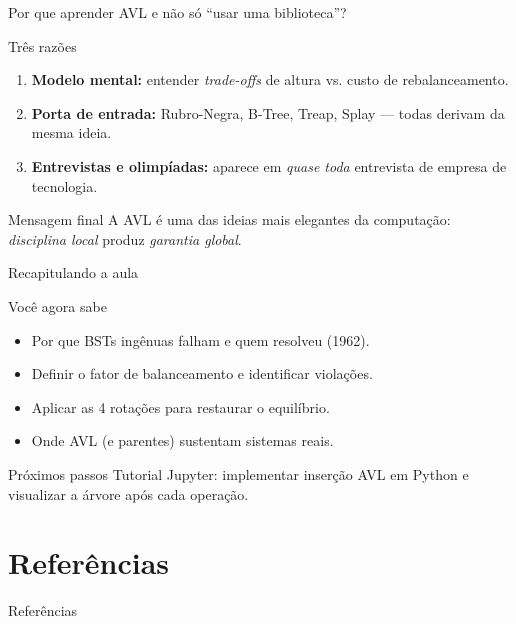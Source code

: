 \documentclass[aspectratio=169]{beamer}
\begin{document}
\begin{frame}{Por que aprender AVL e não só ``usar uma biblioteca''?}
  \begin{block}{Três razões}
    \begin{enumerate}
      \item \textbf{Modelo mental:} entender \emph{trade-offs} de altura
            vs. custo de rebalanceamento.
      \item \textbf{Porta de entrada:} Rubro-Negra, B-Tree, Treap,
            Splay — todas derivam da mesma ideia.
      \item \textbf{Entrevistas e olimpíadas:} aparece em
            \emph{quase toda} entrevista de empresa de tecnologia.
    \end{enumerate}
  \end{block}
  \begin{alertblock}{Mensagem final}
    A AVL é uma das ideias mais elegantes da computação:
    \emph{disciplina local} produz \emph{garantia global}.
  \end{alertblock}
\end{frame}

\begin{frame}{Recapitulando a aula}
  \begin{block}{Você agora sabe}
    \begin{itemize}
      \item Por que BSTs ingênuas falham e quem resolveu (1962).
      \item Definir o fator de balanceamento e identificar violações.
      \item Aplicar as 4 rotações para restaurar o equilíbrio.
      \item Onde AVL (e parentes) sustentam sistemas reais.
    \end{itemize}
  \end{block}
  \begin{exampleblock}{Próximos passos}
    Tutorial Jupyter: implementar inserção AVL em Python e
    visualizar a árvore após cada operação.
  \end{exampleblock}
\end{frame}

\section*{Referências}
\begin{frame}[allowframebreaks]{Referências}
  \nocite{*}
  
  \footnotesize
  
\end{frame}
\end{document}
